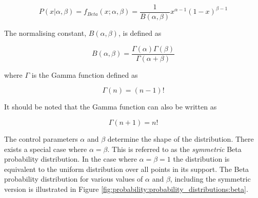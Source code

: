 \begin{equation}
      \label{eq:probability:probability_distributions:beta:pdf}
      P(x \vert \alpha, \beta) = f_{Beta}(x; \alpha, \beta) = \frac{1}{B(\alpha, \beta)} x^{\alpha - 1} (1 - x)^{\beta - 1}
\end{equation}

The normalising constant, $B(\alpha, \beta)$, is defined as

\begin{equation}
      \label{eq:probability:probability_distributions:beta:norm_const}
      B(\alpha, \beta) = \frac{\Gamma(\alpha)\Gamma(\beta)}{\Gamma(\alpha + \beta)}
\end{equation}

where $\Gamma$ is the Gamma function defined as

\begin{equation}
      \label{eq:probability:probability_distributions:beta:gamma_func}
      \Gamma(n) = ( n - 1)!
\end{equation}

It should be noted that the Gamma function can also be written as

\begin{equation}
      \label{eq:probability:probability_distributions:beta:gamma_func_alt}
      \Gamma(n+1) = n!
\end{equation}

The control parameters $\alpha$ and $\beta$ determine the shape of the distribution. There exists a special case where $\alpha = \beta$. This is referred to as the \textit{symmetric} Beta probability distribution. In the case where $\alpha = \beta = 1$ the distribution is equivalent to the uniform distribution over all points in its support. The Beta probability distribution for various values of $\alpha$ and $\beta$, including the symmetric version is illustrated in Figure \ref{fig:probability:probability_distributions:beta}.

